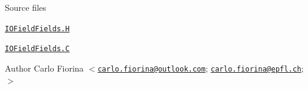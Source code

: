 \begin{DoxyParagraph}{Source files}

\begin{DoxyItemize}
\item \href{../../../home/carlo/data/GeN-Foam/GeN-Foam_ffn/GeN-Foam/GeN-Foam/classes/thermalHydraulics/src/include/IOFieldField/IOFieldFields.H}{\tt I\+O\+Field\+Fields.\+H} 
\item \href{../../../home/carlo/data/GeN-Foam/GeN-Foam_ffn/GeN-Foam/GeN-Foam/classes/thermalHydraulics/src/include/IOFieldField/IOFieldFields.C}{\tt I\+O\+Field\+Fields.\+C} 
\end{DoxyItemize}Author Carlo Fiorina $<$\href{mailto:carlo.fiorina@outlook.com}{\tt carlo.\+fiorina@outlook.\+com}; \href{mailto:carlo.fiorina@epfl.ch}{\tt carlo.\+fiorina@epfl.\+ch};$>$ 
\end{DoxyParagraph}
